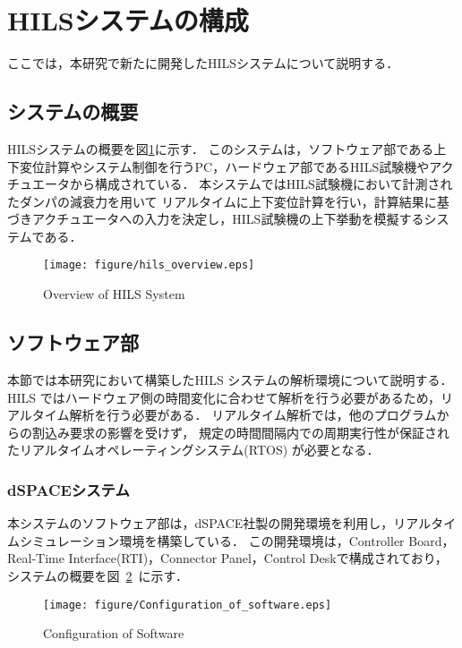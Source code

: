 \documentclass[a4paper,12pt]{article_vdlab_sotsuron}
\begin{document}
\newpage
\section{HILSシステムの構成}
ここでは，本研究で新たに開発したHILSシステムについて説明する．
\subsection{システムの概要}
HILSシステムの概要を図\ref{fig:overviewhils}に示す．
このシステムは，ソフトウェア部である上下変位計算やシステム制御を行うPC，ハードウェア部であるHILS試験機やアクチュエータから構成されている．
本システムではHILS試験機において計測されたダンパの減衰力を用いて
リアルタイムに上下変位計算を行い，計算結果に基づきアクチュエータへの入力を決定し，HILS試験機の上下挙動を模擬するシステムである．

 \vspace{24mm}
\begin{figure}[h]
  \centering
  \texttt{[image: figure/hils\_overview.eps]}
  \vspace{4mm}
   \caption{Overview of HILS System}
  \label{fig:overviewhils}
\end{figure}

\newpage
\subsection{ソフトウェア部}
本節では本研究において構築したHILS システムの解析環境について説明する．
HILS ではハードウェア側の時間変化に合わせて解析を行う必要があるため，リアルタイム解析を行う必要がある．
リアルタイム解析では，他のプログラムからの割込み要求の影響を受けず，
規定の時間間隔内での周期実行性が保証されたリアルタイムオペレーティングシステム(RTOS) が必要となる．

\subsubsection{dSPACEシステム}
本システムのソフトウェア部は，dSPACE社製の開発環境を利用し，リアルタイムシミュレーション環境を構築している．
この開発環境は，Controller Board，Real-Time Interface(RTI)，Connector Panel，Control Deskで構成されており，システムの概要を図~\ref{fig:Configuration_of_software}~に示す．

\vspace*{10mm}
\begin{figure}[h]
  \begin{center}
     \texttt{[image: figure/Configuration\_of\_software.eps]}
     \vspace*{3mm}
     \caption{Configuration of Software}
     \label{fig:Configuration_of_software}
  \end{center}
\end{figure}
\end{document}
